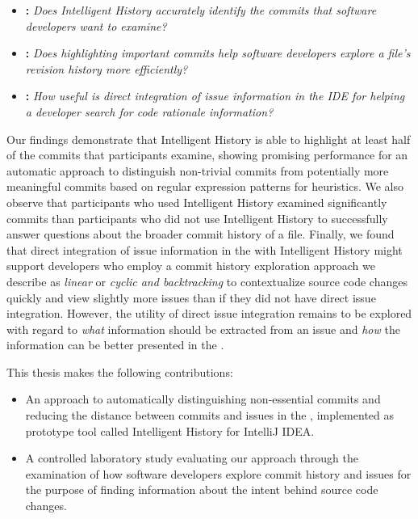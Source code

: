 \begin{itemize}[leftmargin=*]
    \item[] \textbf{:} \textit{Does Intelligent History accurately identify the commits that software developers want to examine?}
    \item[] \textbf{:} \textit{Does highlighting important commits help software developers explore a file’s revision history more efficiently?}
    \item[] \textbf{:} \textit{How useful is direct integration of issue information in the IDE for helping a developer search for code rationale information?}
\end{itemize}

Our findings demonstrate that Intelligent History is able to highlight at least half of
the commits that participants examine, showing promising performance for
an automatic approach to distinguish non-trivial commits from potentially
more meaningful commits based on regular expression patterns for heuristics.
We also observe that participants who used Intelligent History examined significantly
 commits than participants who did not use Intelligent History to successfully answer
questions about the broader commit history of a file.
Finally, we found that direct integration of issue information in the 
with Intelligent History might support developers who employ a commit history exploration approach
we describe as \textit{linear} or \textit{cyclic and backtracking} to contextualize
source code changes quickly and view slightly more issues than if they did not have
direct issue integration. 
However, the utility of direct issue integration remains to be explored with
regard to \emph{what} information should be extracted from an issue
and \emph{how} the information can be better presented in the .

This thesis makes the following contributions:
\begin{itemize}
	\item An approach to automatically distinguishing non-essential commits and reducing the distance between commits and issues in the , 
		implemented as prototype tool called Intelligent History for IntelliJ IDEA.
	\item A controlled laboratory study evaluating our approach through the examination of how software developers explore commit history and issues
		for the purpose of finding information about the intent behind source code changes.
\end{itemize}


